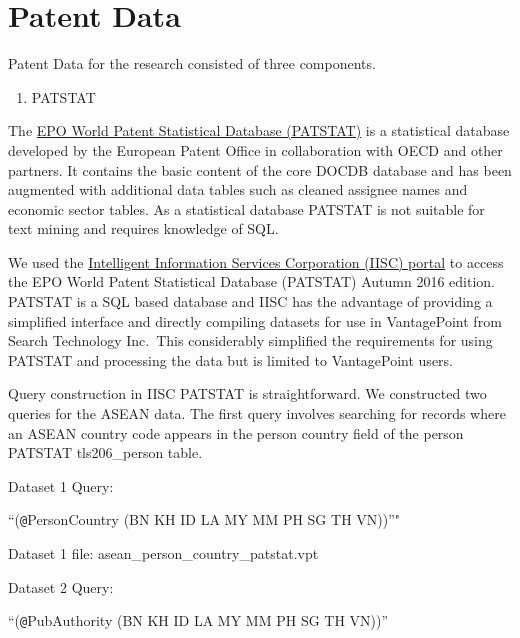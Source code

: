 \documentclass[]{book}
\providecommand{\tightlist}{%
  \setlength{\itemsep}{0pt}\setlength{\parskip}{0pt}}
\theoremstyle{definition}
\theoremstyle{definition}
\theoremstyle{definition}
\theoremstyle{remark}
\begin{document}
\hypertarget{patent-data}{%
\section{Patent Data}\label{patent-data}}

Patent Data for the research consisted of three components.

\begin{enumerate}
\def\labelenumi{\arabic{enumi}.}
\tightlist
\item
  PATSTAT
\end{enumerate}

The
\href{https://www.epo.org/searching-for-patents/business/patstat.html\#tab-1}{EPO
World Patent Statistical Database (PATSTAT)} is a statistical database
developed by the European Patent Office in collaboration with OECD and
other partners. It contains the basic content of the core DOCDB database
and has been augmented with additional data tables such as cleaned
assignee names and economic sector tables. As a statistical database
PATSTAT is not suitable for text mining and requires knowledge of SQL.

We used the
\href{http://www.patstat.org/Patstat/PatstatApp/app/index.html\#/disclaimer}{Intelligent
Information Services Corporation (IISC) portal} to access the EPO World
Patent Statistical Database (PATSTAT) Autumn 2016 edition. PATSTAT is a
SQL based database and IISC has the advantage of providing a simplified
interface and directly compiling datasets for use in VantagePoint from
Search Technology Inc.~This considerably simplified the requirements for
using PATSTAT and processing the data but is limited to VantagePoint
users.

Query construction in IISC PATSTAT is straightforward. We constructed
two queries for the ASEAN data. The first query involves searching for
records where an ASEAN country code appears in the person country field
of the person PATSTAT tls206\_person table.

Dataset 1 Query:

``(\texttt{@}PersonCountry (BN \textbar{} KH \textbar{} ID \textbar{} LA
\textbar{} MY \textbar{} MM \textbar{} PH \textbar{} SG \textbar{} TH
\textbar{} VN))''"

Dataset 1 file: asean\_person\_country\_patstat.vpt

Dataset 2 Query:

``(\texttt{@}PubAuthority (BN \textbar{} KH \textbar{} ID \textbar{} LA
\textbar{} MY \textbar{} MM \textbar{} PH \textbar{} SG \textbar{} TH
\textbar{} VN))''
\end{document}
